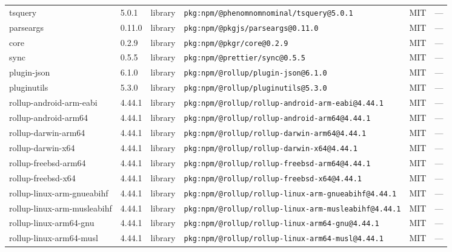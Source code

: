 \documentclass[11pt,a4paper]{article}
\begin{document}
\begin{longtable}{|p{4cm}|p{2cm}|p{1.6cm}|p{5cm}|p{1.5cm}|p{3.5cm}|}
\raggedright tsquery & 5.0.1 & library & \small\texttt{pkg:npm/@phenomnomnominal/tsquery@5.0.1} & MIT & \small — \\
\raggedright parseargs & 0.11.0 & library & \small\texttt{pkg:npm/@pkgjs/parseargs@0.11.0} & MIT & \small — \\
\raggedright core & 0.2.9 & library & \small\texttt{pkg:npm/@pkgr/core@0.2.9} & MIT & \small — \\
\raggedright sync & 0.5.5 & library & \small\texttt{pkg:npm/@prettier/sync@0.5.5} & MIT & \small — \\
\raggedright plugin-json & 6.1.0 & library & \small\texttt{pkg:npm/@rollup/plugin-json@6.1.0} & MIT & \small — \\
\raggedright pluginutils & 5.3.0 & library & \small\texttt{pkg:npm/@rollup/pluginutils@5.3.0} & MIT & \small — \\
\raggedright rollup-android-arm-eabi & 4.44.1 & library & \small\texttt{pkg:npm/@rollup/rollup-android-arm-eabi@4.44.1} & MIT & \small — \\
\raggedright rollup-android-arm64 & 4.44.1 & library & \small\texttt{pkg:npm/@rollup/rollup-android-arm64@4.44.1} & MIT & \small — \\
\raggedright rollup-darwin-arm64 & 4.44.1 & library & \small\texttt{pkg:npm/@rollup/rollup-darwin-arm64@4.44.1} & MIT & \small — \\
\raggedright rollup-darwin-x64 & 4.44.1 & library & \small\texttt{pkg:npm/@rollup/rollup-darwin-x64@4.44.1} & MIT & \small — \\
\raggedright rollup-freebsd-arm64 & 4.44.1 & library & \small\texttt{pkg:npm/@rollup/rollup-freebsd-arm64@4.44.1} & MIT & \small — \\
\raggedright rollup-freebsd-x64 & 4.44.1 & library & \small\texttt{pkg:npm/@rollup/rollup-freebsd-x64@4.44.1} & MIT & \small — \\
\raggedright rollup-linux-arm-gnueabihf & 4.44.1 & library & \small\texttt{pkg:npm/@rollup/rollup-linux-arm-gnueabihf@4.44.1} & MIT & \small — \\
\raggedright rollup-linux-arm-musleabihf & 4.44.1 & library & \small\texttt{pkg:npm/@rollup/rollup-linux-arm-musleabihf@4.44.1} & MIT & \small — \\
\raggedright rollup-linux-arm64-gnu & 4.44.1 & library & \small\texttt{pkg:npm/@rollup/rollup-linux-arm64-gnu@4.44.1} & MIT & \small — \\
\raggedright rollup-linux-arm64-musl & 4.44.1 & library & \small\texttt{pkg:npm/@rollup/rollup-linux-arm64-musl@4.44.1} & MIT & \small — \\

\end{longtable}
\end{document}
